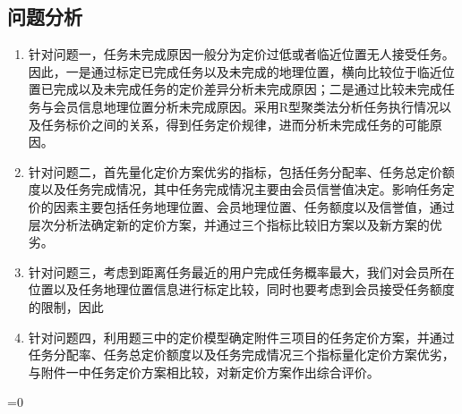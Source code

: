 \documentclass{article}
\begin{document}
\subsection{问题分析}
\begin{enumerate}
	\item 针对问题一，任务未完成原因一般分为定价过低或者临近位置无人接受任务。因此，一是通过标定已完成任务以及未完成的地理位置，横向比较位于临近位置已完成以及未完成任务的定价差异分析未完成原因；二是通过比较未完成任务与会员信息地理位置分析未完成原因。采用R型聚类法分析任务执行情况以及任务标价之间的关系，得到任务定价规律，进而分析未完成任务的可能原因。
	\item 针对问题二，首先量化定价方案优劣的指标，包括任务分配率、任务总定价额度以及任务完成情况，其中任务完成情况主要由会员信誉值决定。影响任务定价的因素主要包括任务地理位置、会员地理位置、任务额度以及信誉值，通过层次分析法确定新的定价方案，并通过三个指标比较旧方案以及新方案的优劣。
	\item 针对问题三，考虑到距离任务最近的用户完成任务概率最大，我们对会员所在位置以及任务地理位置信息进行标定比较，同时也要考虑到会员接受任务额度的限制，因此
	\item 针对问题四，利用题三中的定价模型确定附件三项目的任务定价方案，并通过任务分配率、任务总定价额度以及任务完成情况三个指标量化定价方案优劣，与附件一中任务定价方案相比较，对新定价方案作出综合评价。
\end{enumerate}
\ifnum{}=0
	
\end{document}
